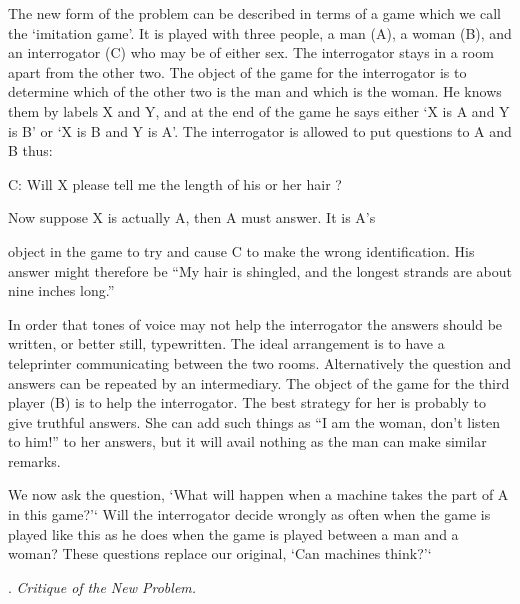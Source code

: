 \documentclass[10pt]{article} %
\newcommand{\dialogueturn}[2]{%
    \noindent\normalfont #1: #2\par %
    \vspace{0.2\baselineskip}%
}
\begin{document}
The new form of the problem can be described in terms of a game which we call the `imitation game'. It is played with three people, a man (A), a woman (B), and an interrogator (C) who may be of either sex. The interrogator stays in a room apart from the other two. The object of the game for the interrogator is to determine which of the other two is the man and which is the woman. He knows them by labels X and Y, and at the end of the game he says either `X is A and Y is B' or `X is B and Y is A'. The interrogator is allowed to put questions to A and B thus:

\vspace{0.5\baselineskip} %
\dialogueturn{C}{Will X please tell me the length of his or her hair ?}%
Now suppose X is actually A, then A must answer. It is A's

object in the game to try and cause C to make the wrong identification. His answer might therefore be
\vspace{0.2\baselineskip} %
``My hair is shingled, and the longest strands are about nine inches long.''\par %
\vspace{0.5\baselineskip} %

In order that tones of voice may not help the interrogator the answers should be written, or better still, typewritten. The ideal arrangement is to have a teleprinter communicating between the two rooms. Alternatively the question and answers can be repeated by an intermediary. The object of the game for the third player (B) is to help the interrogator. The best strategy for her is probably to give truthful answers. She can add such things as ``I am the woman, don't listen to him!'' to her answers, but it will avail nothing as the man can make similar remarks.

We now ask the question, `What will happen when a machine takes the part of A in this game?'` Will the interrogator decide wrongly as often when the game is played like this as he does when the game is played between a man and a woman? These questions replace our original, `Can machines think?'`

\vspace{0.5\baselineskip} %
\noindent{}. \textit{Critique of the New Problem.}
\vspace{0.5\baselineskip} %
\end{document}
